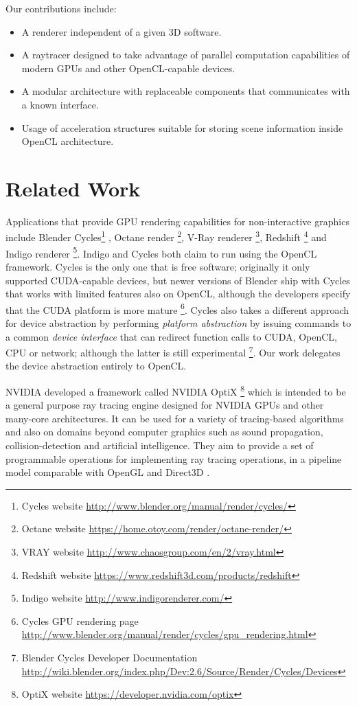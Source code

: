 \documentclass{vgtc}
\begin{document}
Our contributions include:

\begin{itemize}
  \item A renderer independent of a given 3D software.
  \item A raytracer designed to take advantage of parallel
    computation capabilities of modern GPUs and other OpenCL-capable
    devices.
  \item A modular architecture with replaceable components that
    communicates with a known interface.
  \item Usage of acceleration structures suitable for storing scene
    information inside OpenCL architecture.

\end{itemize}

\section{Related Work}
\label{sec:related-work}

Applications that provide GPU rendering capabilities for
non-interactive graphics include Blender Cycles\footnote{Cycles
  website \url{http://www.blender.org/manual/render/cycles/}} , Octane
render \footnote{Octane website
  \url{https://home.otoy.com/render/octane-render/}}, V-Ray renderer
\footnote{VRAY website
  \url{http://www.chaosgroup.com/en/2/vray.html}}, Redshift
\footnote{Redshift website
  \url{https://www.redshift3d.com/products/redshift}} and Indigo
renderer \footnote{Indigo website
  \url{http://www.indigorenderer.com/}}. Indigo and Cycles both claim to
run using the OpenCL framework. Cycles is the only one that is free
software; originally it only supported CUDA-capable devices, but newer
versions of Blender ship with Cycles that works with limited features
also on OpenCL, although the developers specify that the CUDA platform
is more mature \footnote{Cycles GPU rendering page
  \url{http://www.blender.org/manual/render/cycles/gpu_rendering.html}}.
Cycles also takes a different approach for device abstraction by
performing \emph{platform abstraction} by issuing commands to a common
\emph{device interface} that can redirect function calls to CUDA,
OpenCL, CPU or network; although the latter is still experimental
\footnote{Blender Cycles Developer Documentation
  \url{http://wiki.blender.org/index.php/Dev:2.6/Source/Render/Cycles/Devices}}. Our
work delegates the device abstraction entirely to OpenCL.

NVIDIA developed a framework called NVIDIA OptiX \footnote{OptiX
  website \url{https://developer.nvidia.com/optix}} which is intended
to be a general purpose ray tracing engine designed for NVIDIA GPUs
and other many-core architectures. It can be used for a variety of
tracing-based algorithms and also on domains beyond computer graphics
such as sound propagation, collision-detection and artificial
intelligence. They aim to provide a set of programmable operations for
implementing ray tracing operations, in a pipeline model comparable
with OpenGL and Direct3D \cite{Parker:2010:OGP:1778765.1778803}.
\end{document}
